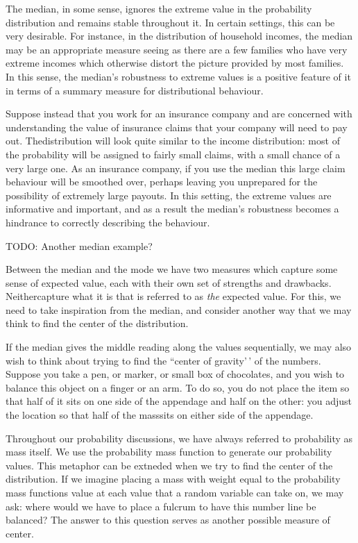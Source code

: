 \documentclass[
  letterpaper,
  DIV=11,
  numbers=noendperiod]{scrreprt}
\begin{document}
The median, in some sense, ignores the extreme value in the probability
distribution and remains stable throughout it. In certain settings, this
can be very desirable. For instance, in the distribution of household
incomes, the median may be an appropriate measure seeing as there are a
few families who have very extreme incomes which otherwise distort the
picture provided by most families. In this sense, the median's
robustness to extreme values is a positive feature of it in terms of a
summary measure for distributional behaviour.

Suppose instead that you work for an insurance company and are concerned
with understanding the value of insurance claims that your company will
need to pay out. Thedistribution will look quite similar to the income
distribution: most of the probability will be assigned to fairly small
claims, with a small chance of a very large one. As an insurance
company, if you use the median this large claim behaviour will be
smoothed over, perhaps leaving you unprepared for the possibility of
extremely large payouts. In this setting, the extreme values are
informative and important, and as a result the median's robustness
becomes a hindrance to correctly describing the behaviour.

TODO: Another median example?

Between the median and the mode we have two measures which capture some
sense of expected value, each with their own set of strengths and
drawbacks. Neithercapture what it is that is referred to as \emph{the}
expected value. For this, we need to take inspiration from the median,
and consider another way that we may think to find the center of the
distribution.

If the median gives the middle reading along the values sequentially, we
may also wish to think about trying to find the ``center of gravity'\,'
of the numbers. Suppose you take a pen, or marker, or small box of
chocolates, and you wish to balance this object on a finger or an arm.
To do so, you do not place the item so that half of it sits on one side
of the appendage and half on the other: you adjust the location so that
half of the masssits on either side of the appendage.

Throughout our probability discussions, we have always referred to
probability as mass itself. We use the probability mass function to
generate our probability values. This metaphor can be extneded when we
try to find the center of the distribution. If we imagine placing a mass
with weight equal to the probability mass functions value at each value
that a random variable can take on, we may ask: where would we have to
place a fulcrum to have this number line be balanced? The answer to this
question serves as another possible measure of center.
\end{document}
